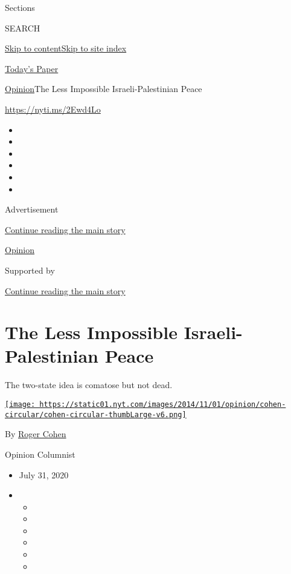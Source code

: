 Sections

SEARCH

\protect\hyperlink{site-content}{Skip to
content}\protect\hyperlink{site-index}{Skip to site index}

\href{https://myaccount.nytimes.com/auth/login?response_type=cookie\&client_id=vi}{}

\href{https://www.nytimes.com/section/todayspaper}{Today's Paper}

\href{/section/opinion}{Opinion}\textbar{}The Less Impossible
Israeli-Palestinian Peace

\url{https://nyti.ms/2Ewd4Lo}

\begin{itemize}
\item
\item
\item
\item
\item
\item
\end{itemize}

Advertisement

\protect\hyperlink{after-top}{Continue reading the main story}

\href{/section/opinion}{Opinion}

Supported by

\protect\hyperlink{after-sponsor}{Continue reading the main story}

\hypertarget{the-less-impossible-israeli-palestinian-peace}{%
\section{The Less Impossible Israeli-Palestinian
Peace}\label{the-less-impossible-israeli-palestinian-peace}}

The two-state idea is comatose but not dead.

\href{https://www.nytimes.com/by/roger-cohen}{\texttt{[image: https://static01.nyt.com/images/2014/11/01/opinion/cohen-circular/cohen-circular-thumbLarge-v6.png]}}

By \href{https://www.nytimes.com/by/roger-cohen}{Roger Cohen}

Opinion Columnist

\begin{itemize}
\item
  July 31, 2020
\item
  \begin{itemize}
  \item
  \item
  \item
  \item
  \item
  \item
  \end{itemize}
\end{itemize}

